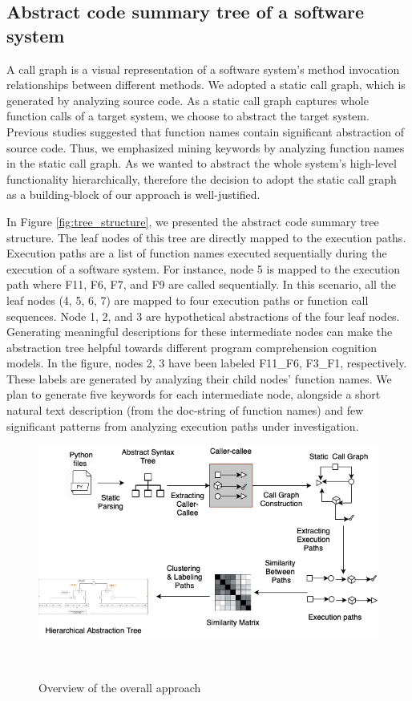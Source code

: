 \subsection{Abstract code summary tree of a software system}
A call graph is a visual representation of a software system's method invocation relationships between different methods. We adopted a static call graph, which is generated by analyzing source code. As a static call graph captures whole function calls of a target system, we choose to abstract the target system. Previous studies suggested that function names contain significant abstraction of source code. 
Thus, we emphasized mining keywords by analyzing function names in the static call graph.
As we wanted to abstract the whole system's high-level functionality hierarchically, therefore the decision to adopt the static call graph as a building-block of our approach is well-justified.

In Figure \ref{fig:tree_structure}, we presented the abstract code summary tree structure. The leaf nodes of this tree are directly mapped to the execution paths. Execution paths are a list of function names executed sequentially during the execution of a software system. For instance, node 5 is mapped to the execution path where F11, F6, F7, and F9 are called sequentially. 
In this scenario, all the leaf nodes (4, 5, 6, 7) are mapped to four execution paths or function call sequences.
Node 1, 2, and 3 are hypothetical abstractions of the four leaf nodes.
Generating meaningful descriptions for these intermediate nodes can make the abstraction tree helpful towards different program comprehension cognition models.
In the figure, nodes 2, 3 have been labeled F11\_F6, F3\_F1, respectively. These labels are generated by analyzing their child nodes' function names. We plan to generate five keywords for each intermediate node, alongside a short natural text description (from the doc-string of function names) and few significant patterns from analyzing execution paths under investigation.

\begin{figure}[tb]
  \centering
  \includegraphics[width=\columnwidth]{figures/hla2/approach_new.png}
  \caption{Overview of the overall approach}~\label{fig:overall}
\end{figure}

